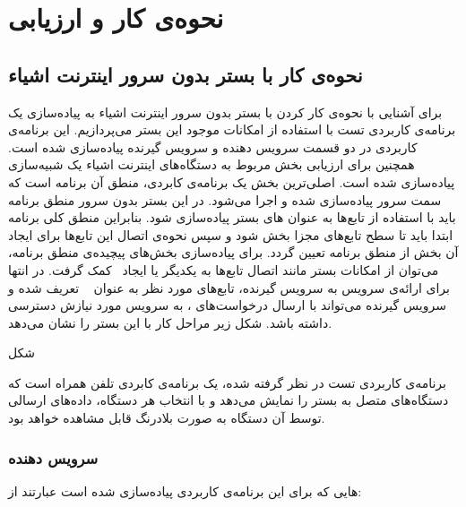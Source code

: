 \chapter{نحوه‌ی کار و ارزیابی}\label{chapter4}

\section{نحوه‌ی کار با بستر بدون سرور اینترنت اشیاء}

برای آشنایی با نحوه‌ی کار کردن با بستر بدون سرور اینترنت اشیاء به پیاده‌سازی یک برنامه‌ی کاربردی تست با استفاده از امکانات موجود این بستر می‌پردازیم. این برنامه‌‌ی کاربردی در دو قسمت سرویس دهنده و سرویس گیرنده پیاده‌سازی شده است. همچنین برای ارزیابی بخش مربوط به دستگاه‌های اینترنت اشیاء یک شبیه‌سازی پیاده‌سازی شده است. اصلی‌ترین بخش یک برنامه‌ی کابردی، منطق آن برنامه است که سمت سرور پیاده‌سازی شده و اجرا می‌شود. در این بستر بدون سرور منطق برنامه باید با استفاده از تابع‌ها به عنوان  های بستر  پیاده‌سازی شود. بنابراین منطق کلی برنامه ابتدا باید تا سطح تابع‌های مجزا بخش شود و سپس نحوه‌ی اتصال این تابع‌ها برای ایجاد آن بخش از منطق برنامه تعیین گردد. برای پیاده‌سازی بخش‌های پیچیده‌ی منطق برنامه، می‌توان از امکانات بستر  مانند اتصال تابع‌ها به یکدیگر یا ایجاد  کمک گرفت. در انتها برای ارائه‌ی سرویس به سرویس گیرنده، تابع‌های مورد نظر به عنوان   تعریف شده و سرویس گیرنده می‌تواند با ارسال درخواست‌های ، به سرویس مورد نیازش دسترسی داشته باشد. شکل زیر مراحل کار با این بستر را نشان می‌دهد.


شکل


برنامه‌ی کاربردی تست در نظر گرفته شده، یک برنامه‌ی کابردی تلفن همراه است که دستگاه‌های متصل به بستر را نمایش می‌دهد و با انتخاب هر دستگاه، داده‌های ارسالی توسط آن دستگاه به صورت بلادرنگ قابل مشاهده خواهد بود.

\subsection{سرویس دهنده}

  هایی که برای این برنامه‌ی کاربردی پیاده‌سازی شده است عبارتند از:

\subsubsection*{}

